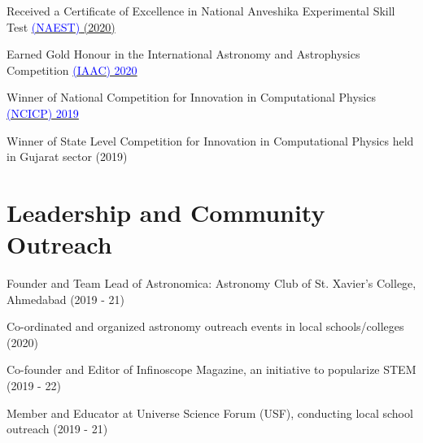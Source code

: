 \documentclass[a4paper,11pt]{article}
\begin{document}
  {Received a Certificate of Excellence in National Anveshika Experimental Skill Test  \href{https://nani.hcverma.in}{\textcolor{blue}{(NAEST)} (2020)} \\

  \vspace{0.5em}
    
  {Earned Gold Honour in the International Astronomy and Astrophysics Competition  \href{https://iaac.space/en}{\textcolor{blue}{(IAAC) 2020}}} \\

  \vspace{0.5em}
    
  {Winner of National Competition for Innovation in Computational Physics \href{https://iapt.org.in/88-activities/2427-ncicp.html}{\textcolor{blue}{(NCICP) 2019}}} \\

  \vspace{0.5em}
    
  {Winner of State Level Competition for Innovation in Computational Physics held in Gujarat sector (2019)}

 \vspace{-0.2em}



\section{Leadership and Community Outreach}
 
  {Founder and Team Lead of Astronomica: Astronomy Club of St. Xavier's College, Ahmedabad (2019 - 21)} \\%
  
    \vspace{0.5em}
    
  {Co-ordinated and organized astronomy outreach events in local schools/colleges (2020)} \\

  \vspace{0.5em}
    
  {Co-founder and Editor of Infinoscope Magazine, an initiative to popularize STEM (2019 - 22)} \\

  \vspace{0.5em}
    
  {Member and Educator at Universe Science Forum (USF), conducting local school outreach (2019 - 21)} \\

}
\end{document}

